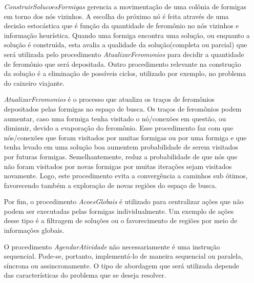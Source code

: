 \textit{ConstruirSolucoesFormigas} gerencia a movimentação de uma colônia de formigas
em torno dos nós vizinhos. A escolha do próximo nó é feita através de uma decisão 
estocástica que é função da quantidade de feromônio no nós vizinhos e informação heurística.
Quando uma formiga encontra uma solução, ou enquanto a solução é construída, esta avalia a
qualidade da solução(completa ou parcial) que será utilizada pelo procedimento
\textit{AtualizarFeromonios} para decidir a quantidade de feromônio que será depositada.
Outro procedimento relevante na construção da solução é a eliminação de possíveis ciclos, utilizado
por exemplo, no problema do caixeiro viajante.

\textit{AtualizarFeromonios} é o processo que atualiza os traços de feromônios depositados pelas
formigas no espaço de busca. Os traços de feromônios podem aumentar, caso uma formiga tenha visitado
o nó/conexões em questão, ou diminuir, devido a evaporação do feromônio. Esse procedimento faz com 
que nós/conexões que foram visitados por muitas formigas ou por uma formiga e que tenha levado em
uma solução boa aumentem probabilidade de serem visitados por futuras formigas. Semelhantemente, reduz 
a probabilidade de que nós que não foram visitados por novas formigas por muitas iterações sejam visitados
novamente. Logo, este procedimento evita a convergência a caminhos sub ótimos, favorecendo também a exploração
de novas regiões do espaço de busca.

Por fim, o procedimento \textit{AcoesGlobais} é utilizado para centralizar ações que não podem ser executadas
pelas formigas individualmente. Um exemplo de ações desse tipo é a filtragem de soluções ou o favorecimento de
regiões por meio de informações globais.

O procedimento \textit{AgendarAtividade} não necessariamente é uma instrução sequencial. Pode-se, portanto,
implementá-lo de maneira sequencial ou paralela, síncrona ou assincronamente. O tipo de abordagem que será
utilizada depende das características do problema que se deseja resolver.

